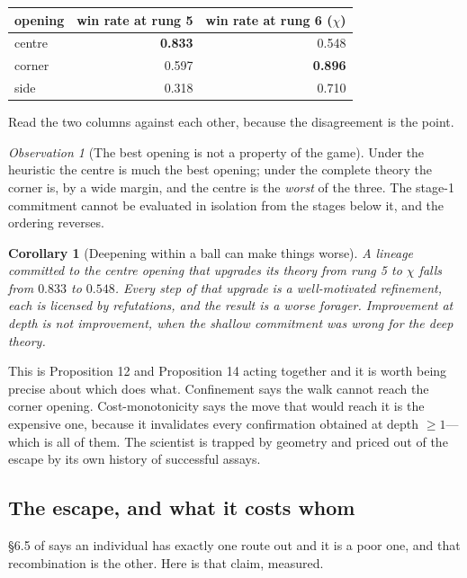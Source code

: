 \documentclass[11pt]{article}
\theoremstyle{definition}
\theoremstyle{plain}
\newtheorem{corollary}[definition]{Corollary}
\theoremstyle{remark}
\newtheorem{observation}[definition]{Observation}
\begin{document}
\begin{center}
\begin{tabular}{@{}lrr@{}}
\toprule
opening & win rate at rung 5 & win rate at rung 6 ($\chi$) \\
\midrule
centre & \textbf{0.833} & 0.548 \\
corner & 0.597 & \textbf{0.896} \\
side   & 0.318 & 0.710 \\
\bottomrule
\end{tabular}
\end{center}

Read the two columns against each other, because the disagreement is the point.

\begin{observation}[The best opening is not a property of the game]
Under the heuristic the centre is much the best opening; under the complete
theory the corner is, by a wide margin, and the centre is the \emph{worst} of
the three. The stage-1 commitment cannot be evaluated in isolation from the
stages below it, and the ordering reverses.
\end{observation}

\begin{corollary}[Deepening within a ball can make things worse]
A lineage committed to the centre opening that upgrades its theory from rung 5
to $\chi$ falls from $0.833$ to $0.548$. Every step of that upgrade is a
well-motivated refinement, each is licensed by refutations, and the result is a
worse forager. Improvement at depth is not improvement, when the shallow
commitment was wrong for the deep theory.
\end{corollary}

This is Proposition 12 and Proposition 14 acting together and it is worth being
precise about which does what. Confinement says the walk cannot reach the corner
opening. Cost-monotonicity says the move that would reach it is the expensive
one, because it invalidates every confirmation obtained at depth $\ge 1$---which
is all of them. The scientist is trapped by geometry and priced out of the
escape by its own history of successful assays.

\subsection{The escape, and what it costs whom}

\S6.5 of \cite{scientist} says an individual has exactly one route out and it is
a poor one, and that recombination is the other. Here is that claim, measured.
\end{document}
